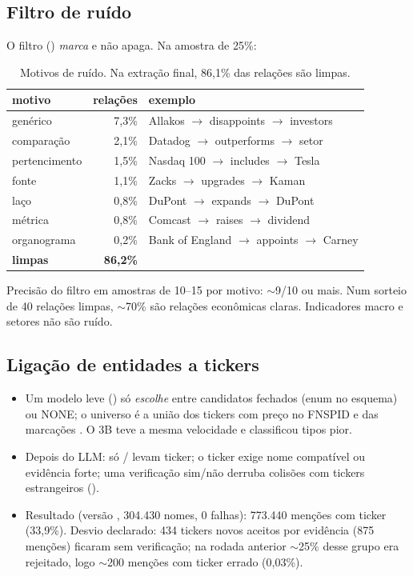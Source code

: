 \documentclass[11pt,a4paper]{article}
\begin{document}
\subsection{Filtro de ruído}

O filtro () \emph{marca} e não apaga. Na amostra de 25\%:

\begin{table}[h]
\centering\small
\begin{tabular}{lrl}
\toprule
motivo & relações & exemplo \\
\midrule
genérico & 7,3\% & Allakos $\to$ disappoints $\to$ investors \\
comparação & 2,1\% & Datadog $\to$ outperforms $\to$ setor \\
pertencimento & 1,5\% & Nasdaq 100 $\to$ includes $\to$ Tesla \\
fonte & 1,1\% & Zacks $\to$ upgrades $\to$ Kaman \\
laço & 0,8\% & DuPont $\to$ expands $\to$ DuPont \\
métrica & 0,8\% & Comcast $\to$ raises $\to$ dividend \\
organograma & 0,2\% & Bank of England $\to$ appoints $\to$ Carney \\
\textbf{limpas} & \textbf{86,2\%} & \\
\bottomrule
\end{tabular}
\caption{Motivos de ruído. Na extração final, 86,1\% das relações são limpas.}
\end{table}

Precisão do filtro em amostras de 10--15 por motivo: $\sim$9/10 ou mais. Num sorteio de 40 relações
limpas, $\sim$70\% são relações econômicas claras. Indicadores macro e setores não são ruído.

\subsection{Ligação de entidades a tickers}

\begin{itemize}
  \item Um modelo leve () só \emph{escolhe} entre candidatos fechados
        (enum no esquema) ou NONE; o universo é a união dos tickers com preço no FNSPID e das marcações
        . O 3B teve a mesma velocidade e classificou tipos pior.
  \item Depois do LLM: só / levam ticker; o ticker exige nome compatível ou
        evidência forte; uma verificação sim/não derruba colisões com tickers estrangeiros
        ().
  \item Resultado (versão , 304.430 nomes, 0 falhas): 773.440 menções com ticker
        (33,9\%). Desvio declarado: 434 tickers novos aceitos por evidência (875 menções) ficaram sem
        verificação; na rodada anterior $\sim$25\% desse grupo era rejeitado, logo $\sim$200 menções com
        ticker errado (0,03\%).
\end{itemize}
\end{document}
